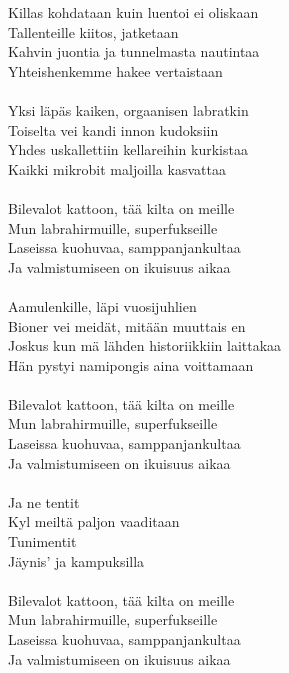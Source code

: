 
            Killas kohdataan kuin luentoi ei oliskaan \\
            Tallenteille kiitos, jatketaan \\
            Kahvin juontia ja tunnelmasta nautintaa \\
            Yhteishenkemme hakee vertaistaan \\
\hspace{10mm} \\
            Yksi läpäs kaiken, orgaanisen labratkin \\
            Toiselta vei kandi innon kudoksiin \\
            Yhdes uskallettiin kellareihin kurkistaa \\
            Kaikki mikrobit maljoilla kasvattaa \\
\hspace{10mm} \\
            Bilevalot kattoon, tää kilta on meille \\
            Mun labrahirmuille, superfukseille \\
            Laseissa kuohuvaa, samppanjankultaa \\
            Ja valmistumiseen on ikuisuus aikaa \\
\hspace{10mm} \\
            Aamulenkille, läpi vuosijuhlien \\
            Bioner vei meidät, mitään muuttais en \\
            Joskus kun mä lähden historiikkiin laittakaa \\
            Hän pystyi namipongis aina voittamaan \\
\hspace{10mm} \\
            Bilevalot kattoon, tää kilta on meille \\
            Mun labrahirmuille, superfukseille \\
            Laseissa kuohuvaa, samppanjankultaa \\
            Ja valmistumiseen on ikuisuus aikaa \\
\hspace{10mm} \\
            Ja ne tentit \\
            Kyl meiltä paljon vaaditaan \\
            Tunimentit \\
            Jäynis’ ja kampuksilla \\
\hspace{10mm} \\
            Bilevalot kattoon, tää kilta on meille \\
            Mun labrahirmuille, superfukseille \\
            Laseissa kuohuvaa, samppanjankultaa \\
            Ja valmistumiseen on ikuisuus aikaa \\
